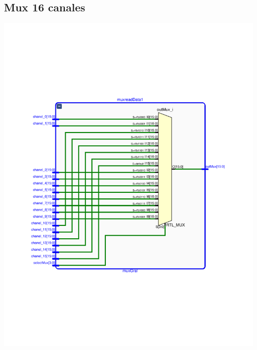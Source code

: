 \documentclass[8pt,executivepaper]{article}
\begin{document}
\subsection{Mux 16 canales}
\begin{center}
  \includegraphics[scale=0.5]{sources/schematicMux16.pdf}
\end{center}
\end{document}

